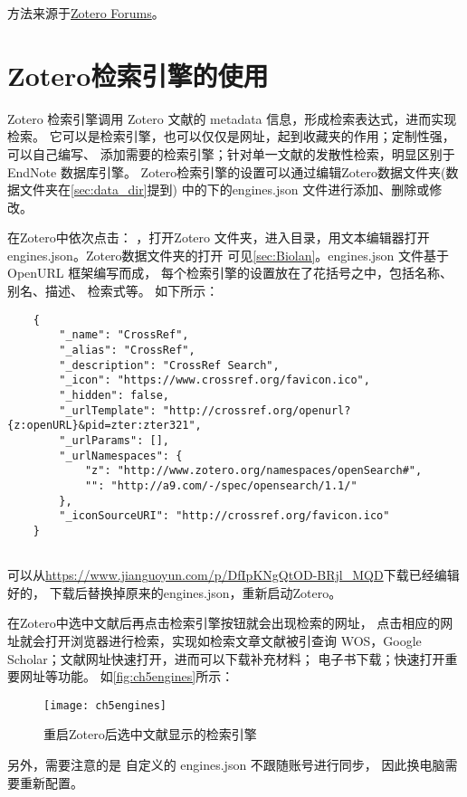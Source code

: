 \documentclass[theorem=false,mathfont=none,openany,sub3section]{easybook}
\begin{document}
{\begin{enumerate}
	方法来源于\href{https://link.zhihu.com/?target=https%3A//forums.zotero.org/discussion/89728/et-al-without-comma%23latest}
	{Zotero Forums}。
\end{enumerate}

\section{Zotero检索引擎的使用}\label{sec:Engines}
Zotero 检索引擎调用 Zotero 文献的 metadata 信息，形成检索表达式，进而实现检索。
它可以是检索引擎，也可以仅仅是网址，起到收藏夹的作用；定制性强，可以自己编写、
添加需要的检索引擎；针对单一文献的发散性检索，明显区别于 EndNote 数据库引擎。
Zotero检索引擎的设置可以通过编辑Zotero数据文件夹(数据文件夹在\cref{sec:data_dir}提到)
中的下的engines.json
文件进行添加、删除或修改。

在Zotero中依次点击：
，打开Zotero 
文件夹，进入目录，用文本编辑器打开engines.json。Zotero数据文件夹的打开
可见\cref{sec:Biolan}。engines.json 文件基于 OpenURL 框架编写而成，
每个检索引擎的设置放在了花括号之中，包括名称、别名、描述、
检索式等。
如下所示：
\begin{lstlisting}
	{
		"_name": "CrossRef",
		"_alias": "CrossRef",
		"_description": "CrossRef Search",
		"_icon": "https://www.crossref.org/favicon.ico",
		"_hidden": false,
		"_urlTemplate": "http://crossref.org/openurl?{z:openURL}&pid=zter:zter321",
		"_urlParams": [],
		"_urlNamespaces": {
			"z": "http://www.zotero.org/namespaces/openSearch#",
			"": "http://a9.com/-/spec/opensearch/1.1/"
		},
		"_iconSourceURI": "http://crossref.org/favicon.ico"
	}
	
\end{lstlisting}


可以从\url{https://www.jianguoyun.com/p/DfIpKNgQtOD-BRjl_MQD}下载已经编辑好的，
下载后替换掉原来的engines.json，重新启动Zotero。

在Zotero中选中文献后再点击检索引擎按钮就会出现检索的网址，
点击相应的网址就会打开浏览器进行检索，实现如检索文章文献被引查询
WOS，Google Scholar；文献网址快速打开，进而可以下载补充材料；
电子书下载；快速打开重要网址等功能。	
如\autoref{fig:ch5engines}所示：
\begin{figure}[ht]
	\centering
	\texttt{[image: ch5engines]}
	\caption{重启Zotero后选中文献显示的检索引擎}
	\label{fig:ch5engines}
\end{figure}
另外，需要注意的是
自定义的 engines.json 不跟随账号进行同步，
因此换电脑需要重新配置。

}
\end{document}
